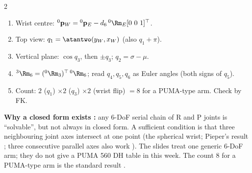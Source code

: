 \begin{multicols}{2}
\begin{recipe}
\label{w3:wrist}
\begin{enumerate}
\item Wrist centre: ${}^0\mathbf p_W={}^0\mathbf p_E-d_6\,{}^0\Rm_E[0\ 0\ 1]^\top$.
\item Top view: $q_1=\atantwo(y_W,x_W)$ (also $q_1+\pi$).
\item Vertical plane: $\cos q_3$, then $\pm q_3$; $q_2=\sigma-\mu$.
\item ${}^3\Rm_6=({}^0\Rm_3)^\top\,{}^0\Rm_6$; read $q_4,q_5,q_6$ as Euler angles (both signs of $q_5$).
\item Count: $2$ ($q_1$) $\times2$ ($q_3$) $\times2$ (wrist flip) $=8$ for a PUMA-type arm. Check by FK.
\end{enumerate}
\end{recipe}
\textbf{Why a closed form exists :} any 6-DoF serial chain of R and P joints is ``solvable'', but not always in closed form. A sufficient condition is that three neighbouring joint axes intersect at one point (the spherical wrist; Pieper's result \added; three consecutive parallel axes also work \added). The slides treat one generic 6-DoF arm; they do not give a PUMA 560 DH table in this week. The count $8$ for a PUMA-type arm is the standard result \added.


\end{multicols}
